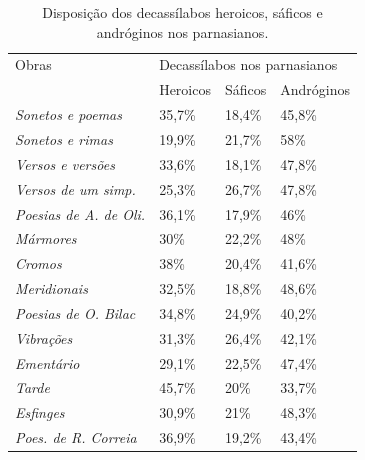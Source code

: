 \documentclass[portuguese]{textolivre}
\begin{document}
\begin{table}[!htbp]
\centering
\begin{threeparttable}
\caption{Disposição dos decassílabos heroicos, sáficos e andróginos nos parnasianos.}
\label{tbl4}
\begin{tabular}{llll}
\toprule
Obras & \multicolumn{3}{l}{Decassílabos nos parnasianos} \\
& Heroicos & Sáficos & Andróginos \\
\midrule
\textit{Sonetos e poemas} &
35,7\% &
18,4\% &
45,8\% \\
\textit{Sonetos e rimas} &
19,9\% &
21,7\% &
58\% \\
\textit{Versos e versões} &
33,6\% &
18,1\% &
47,8\% \\
\textit{Versos de um simp.} &
25,3\% &
26,7\% &
47,8\% \\
\textit{Poesias de A. de Oli.} &
36,1\% &
17,9\% &
46\% \\
\textit{Mármores} &
30\% &
22,2\% &
48\% \\
\textit{Cromos} &
38\% &
20,4\% &
41,6\% \\
\textit{Meridionais} &
32,5\% &
18,8\% &
48,6\% \\
\textit{Poesias de O. Bilac} &
34,8\% &
24,9\% &
40,2\% \\
\textit{Vibrações} &
31,3\% &
26,4\% &
42,1\% \\
\textit{Ementário} &
29,1\% &
22,5\% &
47,4\% \\
\textit{Tarde} &
45,7\% &
20\% &
33,7\% \\
\textit{Esfinges} &
30,9\% &
21\% &
48,3\% \\
\textit{Poes. de R. Correia} &
36,9\% &
19,2\% &
43,4\% \\
\bottomrule
\end{tabular}
\end{threeparttable}
\end{table}
\end{document}
